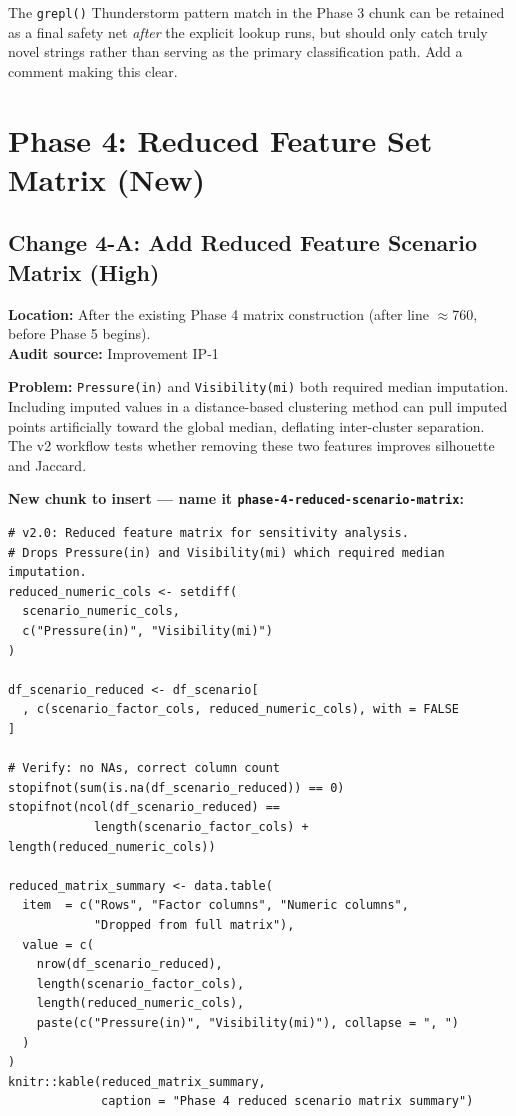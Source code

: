 \documentclass[11pt]{article}
\newcommand{\rcode}[1]{\texttt{#1}}
\begin{document}
The \rcode{grepl()} Thunderstorm pattern match in the Phase 3 chunk can be
retained as a final safety net \textit{after} the explicit lookup runs, but
should only catch truly novel strings rather than serving as the primary
classification path. Add a comment making this clear.

\section{Phase 4: Reduced Feature Set Matrix (New)}

\subsection{Change 4-A: Add Reduced Feature Scenario Matrix (High)}

\textbf{Location:} After the existing Phase 4 matrix construction
(after line $\approx$760, before Phase 5 begins).\\
\textbf{Audit source:} Improvement IP-1

\textbf{Problem:} \rcode{Pressure(in)} and \rcode{Visibility(mi)} both required
median imputation. Including imputed values in a distance-based clustering
method can pull imputed points artificially toward the global median,
deflating inter-cluster separation. The v2 workflow tests whether removing
these two features improves silhouette and Jaccard.

\textbf{New chunk to insert --- name it \rcode{phase-4-reduced-scenario-matrix}:}
\begin{lstlisting}
# v2.0: Reduced feature matrix for sensitivity analysis.
# Drops Pressure(in) and Visibility(mi) which required median imputation.
reduced_numeric_cols <- setdiff(
  scenario_numeric_cols,
  c("Pressure(in)", "Visibility(mi)")
)

df_scenario_reduced <- df_scenario[
  , c(scenario_factor_cols, reduced_numeric_cols), with = FALSE
]

# Verify: no NAs, correct column count
stopifnot(sum(is.na(df_scenario_reduced)) == 0)
stopifnot(ncol(df_scenario_reduced) ==
            length(scenario_factor_cols) + length(reduced_numeric_cols))

reduced_matrix_summary <- data.table(
  item  = c("Rows", "Factor columns", "Numeric columns",
            "Dropped from full matrix"),
  value = c(
    nrow(df_scenario_reduced),
    length(scenario_factor_cols),
    length(reduced_numeric_cols),
    paste(c("Pressure(in)", "Visibility(mi)"), collapse = ", ")
  )
)
knitr::kable(reduced_matrix_summary,
             caption = "Phase 4 reduced scenario matrix summary")
\end{lstlisting}
\end{document}

